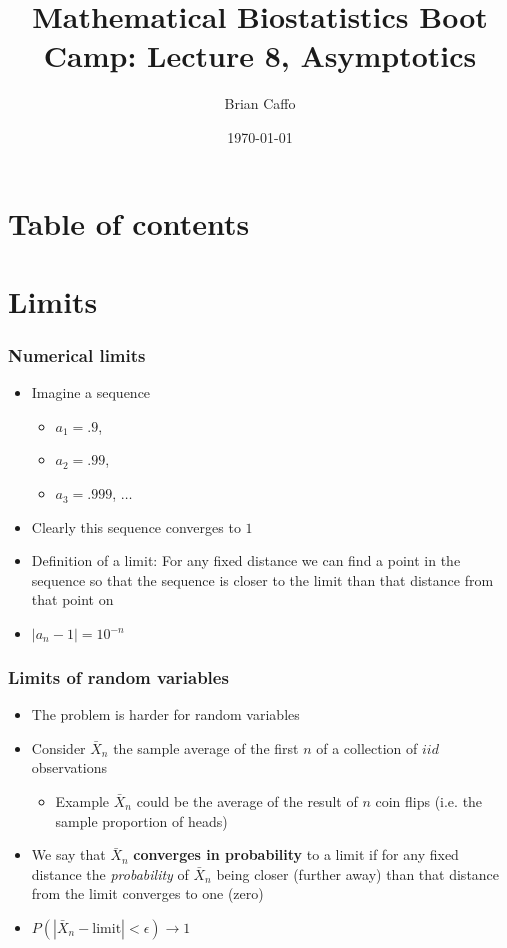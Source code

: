 \documentclass[aspectratio=169]{beamer}
\title{Mathematical Biostatistics Boot Camp: Lecture 8, Asymptotics}
\author{Brian Caffo}
\date{\today}
\institute[Department of Biostatistics]{
  Department of Biostatistics \\
  Johns Hopkins Bloomberg School of Public Health\\
  Johns Hopkins University
}
\begin{document}
\frame{\titlepage}


\section{Table of contents}

\section{Limits}
\begin{frame}\frametitle{Numerical limits}
  \begin{itemize}
  \item Imagine a sequence
    \begin{itemize}
    \item $a_1 = .9$,
    \item $a_2 = .99$,
    \item $a_3 = .999$, $\hdots$
    \end{itemize}
  \item Clearly this sequence converges to $1$
  \item Definition of a limit: For any fixed distance we can find a
    point in the sequence so that the sequence is closer to the limit
    than that distance from that point on
  \item $|a_n - 1| = 10^{-n}$
  \end{itemize}
\end{frame}

\begin{frame}\frametitle{Limits of random variables}
  \begin{itemize}
  \item The problem is harder for random variables
  \item Consider $\bar X_n$ the sample average of the first $n$ of
    a collection of $iid$ observations
    \begin{itemize}
    \item Example $\bar X_n$ could be the average of the result of
      $n$ coin flips (i.e. the sample proportion of heads)
    \end{itemize}
  \item We say that $\bar X_n$ {\bf converges in probability} to a limit
    if for any fixed distance the {\em probability} of $\bar X_n$ being
    closer (further away) than that distance from the limit converges to
    one (zero)
  \item $P(|\bar X_n - \mbox{limit}| < \epsilon) \rightarrow 1$ 
  \end{itemize}
\end{frame}
\end{document}
